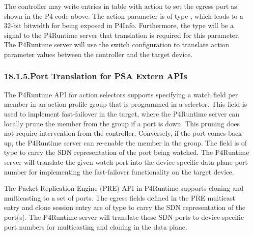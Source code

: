 \documentclass[11pt]{article}
\begin{document}
{%
\noindent{}The controller may write entries in table  with action  to set the egress
port as shown in the P4 code above. The action parameter  is of type
, which leads to a 32-bit bitwidth for  being exposed in
P4Info. Furthermore, the type will be a signal to the P4Runtime server that
translation is required for this parameter. The P4Runtime server will use the
switch configuration to translate action parameter values between the controller
and the target device.%

\subsubsection{18.1.5.\hspace*{0.5em}Port Translation for PSA Extern APIs}\label{sec-port-translation-for-psa-extern-apis}%

\noindent{}The P4Runtime API for action selectors supports specifying a watch field per
member in an action profile group that is programmed in a selector. This field
is used to implement fast-failover in the target, where the P4Runtime server can
locally prune the member from the group if a port is down. This pruning does not
require intervention from the controller. Conversely, if the port comes back up,
the P4Runtime server can re-enable the member in the group. The 
field is of type  to carry the SDN representation of the port being
watched. The P4Runtime server will translate the given watch port into
the device-specific data plane port number for implementing the fast-failover
functionality on the target device.%

The Packet Replication Engine (PRE) API in P4Runtime supports cloning and
multicasting to a set of ports. The egress  fields defined in the PRE
multicast entry and clone session entry are of type  to carry the SDN
representation of the port(s). The P4Runtime server will translate these SDN
ports to device-specific port numbers for multicasting and cloning in the data
plane.%

}
\end{document}
